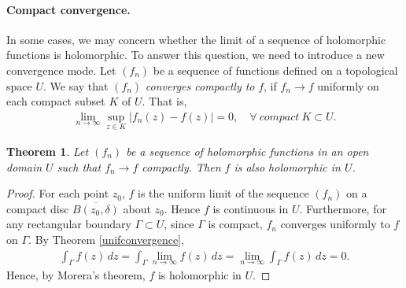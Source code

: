 \documentclass{article}
\numberwithin{equation}{section}
\newcommand{\ol}{\overline}
\theoremstyle{plain}
\newtheorem{theorem}{Theorem}[section]
\theoremstyle{definition}
\begin{document}
\paragraph{Compact convergence.} In some cases, we may concern whether the limit of a sequence of holomorphic functions is holomorphic. To answer this question, we need to introduce a new convergence mode. Let $(f_n)$ be a sequence of functions defined on a topological space $U$. We say that $(f_n)$ \textit{converges compactly to} $f$, if $f_n\to f$ uniformly on each compact subset $K$ of $U$. That is,
\begin{align*}
	\lim_{n\to\infty}\sup_{z\in K}\vert f_n(z)-f(z)\vert = 0,\quad\forall\  compact\ K\subset U.
\end{align*}

\begin{theorem}\label{compactholoconvg}
Let $(f_n)$ be a sequence of holomorphic functions in an open domain $U$ such that $f_n\to f$ compactly. Then $f$ is also holomorphic in $U$.
\end{theorem}
\begin{proof}
For each point $z_0$, $f$ is the uniform limit of the sequence $(f_n)$ on a compact disc $\ol{B(z_0,\delta)}$ about $z_0$. Hence $f$ is continuous in $U$. Furthermore, for any rectangular boundary $\Gamma\subset U$, since $\Gamma$ is compact, $f_n$ converges uniformly to $f$ on $\Gamma$. By Theorem \ref{unifconvergence},
\begin{align*}
	\int_\Gamma f(z)\,dz=\int_\Gamma\lim_{n\to\infty}f(z)\,dz=\lim_{n\to\infty}\int_\Gamma f(z)\,dz=0.
\end{align*}
Hence, by Morera’s theorem, $f$ is holomorphic in $U$.
\end{proof}
\end{document}

